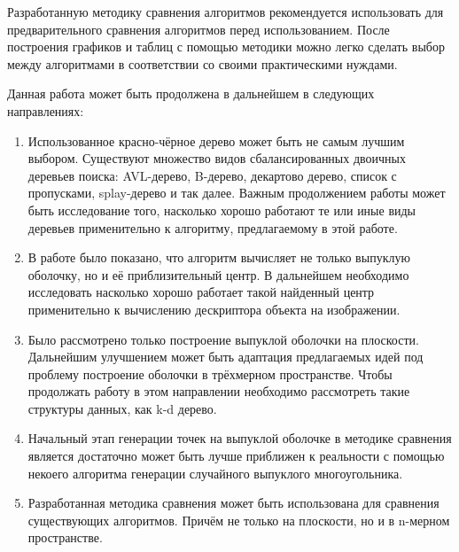 Разработанную методику сравнения алгоритмов рекомендуется использовать для предварительного сравнения алгоритмов перед использованием. После построения графиков и таблиц с помощью методики можно легко сделать выбор между алгоритмами в соответствии со своими практическими нуждами.

Данная работа может быть продолжена в дальнейшем в следующих направлениях:
\begin{enumerate}
	\item Использованное красно-чёрное дерево может быть не самым лучшим выбором. Существуют множество видов сбалансированных двоичных деревьев поиска: AVL-дерево, B-дерево, декартово дерево, список с пропусками, splay-дерево и так далее\cite{neerc2010algorithms}. Важным продолжением работы может быть исследование того, насколько хорошо работают те или иные виды деревьев применительно к алгоритму, предлагаемому в этой работе.
	\item В работе было показано, что алгоритм вычисляет не только выпуклую оболочку, но и её приблизительный центр. В дальнейшем необходимо исследовать насколько хорошо работает такой найденный центр применительно к вычислению дескриптора объекта на изображении.
	\item Было рассмотрено только построение выпуклой оболочки на плоскости. Дальнейшим улучшением может быть адаптация предлагаемых идей под проблему построение оболочки в трёхмерном пространстве. Чтобы продолжать работу в этом направлении необходимо рассмотреть такие структуры данных, как k-d дерево\cite{bentley1975multidimensional}.
	\item Начальный этап генерации точек на выпуклой оболочке в методике сравнения является достаточно может быть лучше приближен к реальности с помощью некоего алгоритма генерации случайного выпуклого многоугольника.
	\item Разработанная методика сравнения может быть использована для сравнения существующих алгоритмов. Причём не только на плоскости, но и в n-мерном пространстве.
\end{enumerate}

